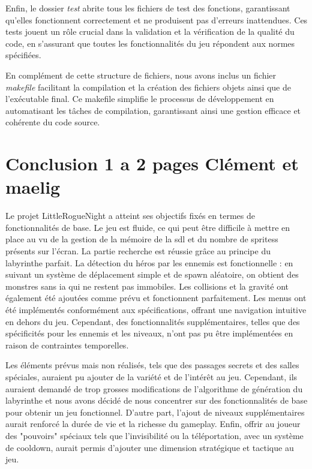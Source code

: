\documentclass[10pt]{article}
\begin{document}
Enfin, le dossier \textit{test} abrite tous les fichiers de test des fonctions, garantissant qu'elles fonctionnent correctement et ne produisent pas d'erreurs inattendues. Ces tests jouent un rôle crucial dans la validation et la vérification de la qualité du code, en s'assurant que toutes les fonctionnalités du jeu répondent aux normes spécifiées.

En complément de cette structure de fichiers, nous avons inclus un fichier \textit{makefile} facilitant la compilation et la création des fichiers objets ainsi que de l'exécutable final. Ce makefile simplifie le processus de développement en automatisant les tâches de compilation, garantissant ainsi une gestion efficace et cohérente du code source.


   
\section{Conclusion 1 a 2 pages Clément et maelig}

Le projet LittleRogueNight a atteint ses objectifs fixés en termes de fonctionnalités de base. Le jeu est fluide, ce qui peut être difficile à mettre en place au vu de la gestion de la mémoire de la \gls{sdl} et du nombre de \glspl{sprites} présents sur l'écran. La partie recherche est réussie grâce au principe du labyrinthe parfait. La détection du héros par les ennemis est fonctionnelle : en suivant un système de déplacement simple et de spawn aléatoire, on obtient des monstres sans \gls{ia} qui ne restent pas immobiles. Les collisions et la gravité ont également été ajoutées comme prévu et fonctionnent parfaitement. Les menus ont été implémentés conformément aux spécifications, offrant une navigation intuitive en dehors du jeu. Cependant, des fonctionnalités supplémentaires, telles que des spécificités pour les ennemis et les niveaux, n'ont pas pu être implémentées en raison de contraintes temporelles.

Les éléments prévus mais non réalisés, tels que des passages secrets et des salles spéciales, auraient pu ajouter de la variété et de l'intérêt au jeu. Cependant, ils auraient demandé de trop grosses modifications de l'algorithme de génération du labyrinthe et nous avons décidé de nous concentrer sur des fonctionnalités de base pour obtenir un jeu fonctionnel. D'autre part, l'ajout de niveaux supplémentaires aurait renforcé la durée de vie et la richesse du \gls{gameplay}. Enfin, offrir au joueur des "pouvoirs" spéciaux tels que l'invisibilité ou la téléportation, avec un système de cooldown, aurait permis d'ajouter une dimension stratégique et tactique au jeu.
\end{document}
